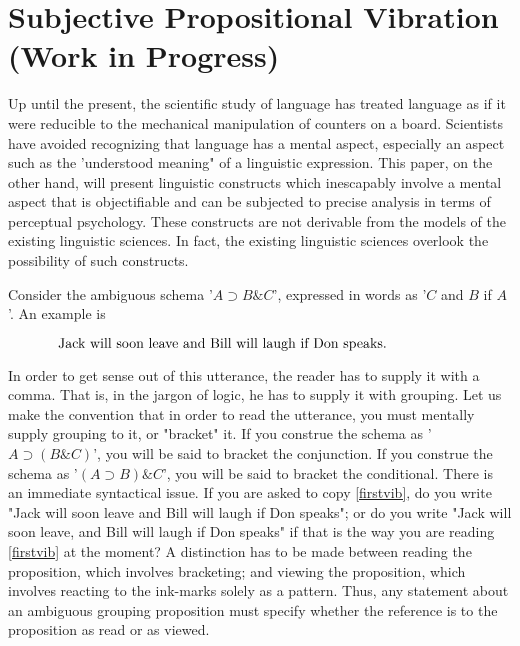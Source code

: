 \chapter{Subjective Propositional Vibration (Work in Progress)}

Up until the present, the scientific study of language has treated 
language as if it were reducible to the mechanical manipulation of counters 
on a board. Scientists have avoided recognizing that language has a mental 
aspect, especially an aspect such as the 'understood meaning" of a linguistic 
expression. This paper, on the other hand, will present linguistic constructs 
which inescapably involve a mental aspect that is objectifiable and can be 
subjected to precise analysis in terms of perceptual psychology. These 
constructs are not derivable from the models of the existing linguistic 
sciences. In fact, the existing linguistic sciences overlook the possibility of 
such constructs. 

Consider the ambiguous schema '$A\supset B\&C$', expressed in words as '$C$ and 
$B$ if $A$'. An example is 

\begin{equation}
	\label{firstvib}
	\parbox{4in}{Jack will soon leave and Bill will laugh if Don speaks.}
\end{equation}

In order to get sense out of this utterance, the reader has to supply it with a 
comma. That is, in the jargon of logic, he has to supply it with grouping. Let 
us make the convention that in order to read the utterance, you must 
mentally supply grouping to it, or "bracket" it. If you construe the schema 
as '$A\supset (B\&C)$', you will be said to bracket the conjunction. If you construe 
the schema as '$(A\supset B)\&C$', you will be said to bracket the conditional. There 
is an immediate syntactical issue. If you are asked to copy \ref{firstvib}, do you write 
"Jack will soon leave and Bill will laugh if Don speaks"; or do you write 
"Jack will soon leave, and Bill will laugh if Don speaks" if that is the way 
you are reading \ref{firstvib} at the moment? A distinction has to be made between 
reading the proposition, which involves bracketing; and viewing the 
proposition, which involves reacting to the ink-marks solely as a pattern. 
Thus, any statement about an ambiguous grouping proposition must specify 
whether the reference is to the proposition as read or as viewed. 

